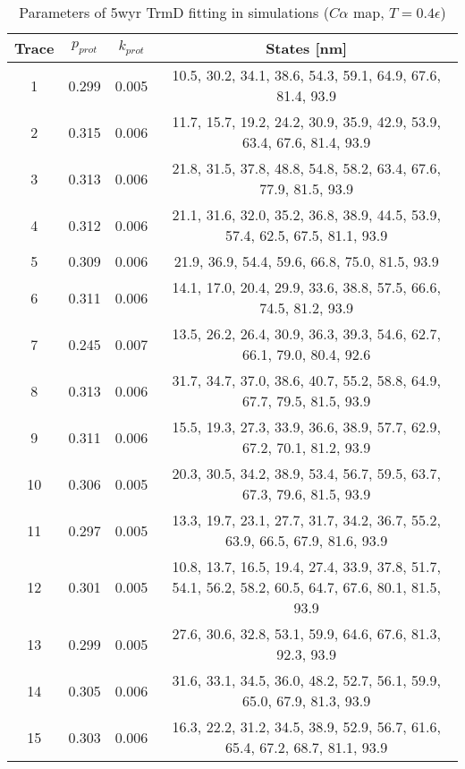 \begin{table}
    \tiny
    \centering
    \caption{Parameters of 5wyr TrmD fitting in simulations ($C\alpha$ map, $T=0.4\epsilon$)}
    \label{tab:5wyr-cc-parameters}
    \begin{tabular}{c|c|c|c}
        \textbf{Trace} & \textbf{$p_{prot}$} & \textbf{$k_{prot}$} & \textbf{States [nm]}\\\hline
        1 & 0.299 & 0.005 & 10.5, 30.2, 34.1, 38.6, 54.3, 59.1, 64.9, 67.6, 81.4, 93.9\\
        2 & 0.315 & 0.006 & 11.7, 15.7, 19.2, 24.2, 30.9, 35.9, 42.9, 53.9, 63.4, 67.6, 81.4, 93.9\\
        3 & 0.313 & 0.006 & 21.8, 31.5, 37.8, 48.8, 54.8, 58.2, 63.4, 67.6, 77.9, 81.5, 93.9\\
        4 & 0.312 & 0.006 & 21.1, 31.6, 32.0, 35.2, 36.8, 38.9, 44.5, 53.9, 57.4, 62.5, 67.5, 81.1, 93.9\\
        5 & 0.309 & 0.006 & 21.9, 36.9, 54.4, 59.6, 66.8, 75.0, 81.5, 93.9\\
        6 & 0.311 & 0.006 & 14.1, 17.0, 20.4, 29.9, 33.6, 38.8, 57.5, 66.6, 74.5, 81.2, 93.9\\
        7 & 0.245 & 0.007 & 13.5, 26.2, 26.4, 30.9, 36.3, 39.3, 54.6, 62.7, 66.1, 79.0, 80.4, 92.6\\
        8 & 0.313 & 0.006 & 31.7, 34.7, 37.0, 38.6, 40.7, 55.2, 58.8, 64.9, 67.7, 79.5, 81.5, 93.9\\
        9 & 0.311 & 0.006 & 15.5, 19.3, 27.3, 33.9, 36.6, 38.9, 57.7, 62.9, 67.2, 70.1, 81.2, 93.9\\
        10 & 0.306 & 0.005 & 20.3, 30.5, 34.2, 38.9, 53.4, 56.7, 59.5, 63.7, 67.3, 79.6, 81.5, 93.9\\
        11 & 0.297 & 0.005 & 13.3, 19.7, 23.1, 27.7, 31.7, 34.2, 36.7, 55.2, 63.9, 66.5, 67.9, 81.6, 93.9\\
        12 & 0.301 & 0.005 & 10.8, 13.7, 16.5, 19.4, 27.4, 33.9, 37.8, 51.7, 54.1, 56.2, 58.2, 60.5, 64.7, 67.6, 80.1, 81.5, 93.9\\
        13 & 0.299 & 0.005 & 27.6, 30.6, 32.8, 53.1, 59.9, 64.6, 67.6, 81.3, 92.3, 93.9\\
        14 & 0.305 & 0.006 & 31.6, 33.1, 34.5, 36.0, 48.2, 52.7, 56.1, 59.9, 65.0, 67.9, 81.3, 93.9\\
        15 & 0.303 & 0.006 & 16.3, 22.2, 31.2, 34.5, 38.9, 52.9, 56.7, 61.6, 65.4, 67.2, 68.7, 81.1, 93.9\\
    \end{tabular}
\end{table}

